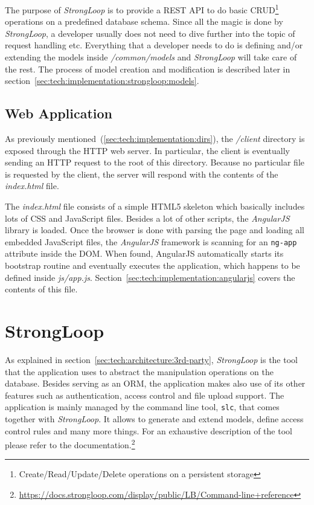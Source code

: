 \documentclass[nochapterpage,nopartpage,noheadingspace,numbersubsubsec,bigchapter,colorback,accentcolor=tud9c,10pt]{tudreport}
\begin{document}
    The purpose of \emph{StrongLoop} is to provide a REST API to do basic CRUD\footnote{Create/Read/Update/Delete operations on a persistent storage} operations on a predefined database schema. Since all the magic is done by \emph{StrongLoop}, a developer usually does not need to dive further into the topic of request handling etc. Everything that a developer needs to do is defining and/or extending the models inside \emph{/common/models} and \emph{StrongLoop} will take care of the rest. The process of model creation and modification is described later in section~\ref{sec:tech:implementation:strongloop:models}.

  \subsection{Web Application}
  \label{sec:tech:implementation:bootstrapping:web}

    As previously mentioned~(\ref{sec:tech:implementation:dirs}), the \emph{/client} directory is exposed through the HTTP web server. In particular, the client is eventually sending an HTTP request to the root of this directory. Because no particular file is requested by the client, the server will respond with the contents of the \emph{index.html} file.

    The \emph{index.html} file consists of a simple HTML5 skeleton which basically includes lots of CSS and JavaScript files. Besides a lot of other scripts, the \emph{AngularJS} library is loaded. Once the browser is done with parsing the page and loading all embedded JavaScript files, the \emph{AngularJS} framework is scanning for an \texttt{ng-app} attribute inside the DOM. When found, AngularJS automatically starts its bootstrap routine and eventually executes the application, which happens to be defined inside \emph{js/app.js}. Section~\ref{sec:tech:implementation:angularjs} covers the contents of this file.

  \section{StrongLoop}
  \label{sec:tech:implementation:strongloop}

    As explained in section~\ref{sec:tech:architecture:3rd-party}, \emph{StrongLoop} is the tool that the application uses to abstract the manipulation operations on the database. Besides serving as an ORM, the application makes also use of its other features such as authentication, access control and file upload support. The application is mainly managed by the command line tool, \texttt{slc}, that comes together with \emph{StrongLoop}. It allows to generate and extend models, define access control rules and many more things. For an exhaustive description of the tool please refer to the documentation.\footnote{\url{https://docs.strongloop.com/display/public/LB/Command-line+reference}}
\end{document}
